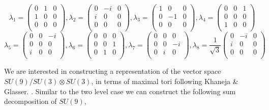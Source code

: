 \documentclass{amsart}
\begin{document}
$$ \lambda_1=
\begin{pmatrix}
 0 & 1 & 0 \\
 1 & 0 & 0 \\
 0 & 0 & 0 \\
\end{pmatrix}
,\lambda_2=
\begin{pmatrix}
 0 & -i & 0 \\
 i & 0 & 0 \\
 0 & 0 & 0 \\
\end{pmatrix}
,\lambda_3=
\begin{pmatrix}
 1 & 0 & 0 \\
 0 & -1 & 0 \\
 0 & 0 & 0 \\
\end{pmatrix}
,\lambda_4=
\begin{pmatrix}
 0 & 0 & 1 \\
 0 & 0 & 0 \\
 1 & 0 & 0 \\
\end{pmatrix}
$$
$$\lambda_5=\begin{pmatrix}
 0 & 0 & -i \\
 0 & 0 & 0 \\
 i & 0 & 0 \\
\end{pmatrix}
,\lambda_6=
\begin{pmatrix}
 0 & 0 & 0 \\
 0 & 0 & 1 \\
 0 & 1 & 0 \\
\end{pmatrix}
,\lambda_7=
\begin{pmatrix}
 0 & 0 & 0 \\
 0 & 0 & -i \\
 0 & i & 0 \\
\end{pmatrix}
,\lambda_8= \frac{1}{\sqrt{3}}
\begin{pmatrix}
 0 & -i & 0 \\
 i & 0 & 0 \\
 0 & 0 & 0 \\
\end{pmatrix}
$$

We are interested in constructing a representation of the vector space $SU(9)/SU(3)\otimes SU(3)$, in terms of maximal tori following Khaneja \& Glasser. \cite{KhanejaGlasser}. Similar to the two level case we can construct the following sum decomposition of $SU(9)$,
\end{document}
